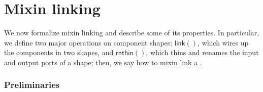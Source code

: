 \chapter{Mixin linking} %
\label{sec:mix-in}

We now formalize mixin linking and describe some of its properties.
In particular, we define two major operations
on component shapes: $\textsf{link}()$, which wires up the components in
two shapes, and $\textsf{rnthin}()$, which thins and renames the input
and output ports of a shape; then, we say how to mixin link a
\ccomp{}.

\subsection{Preliminaries}

